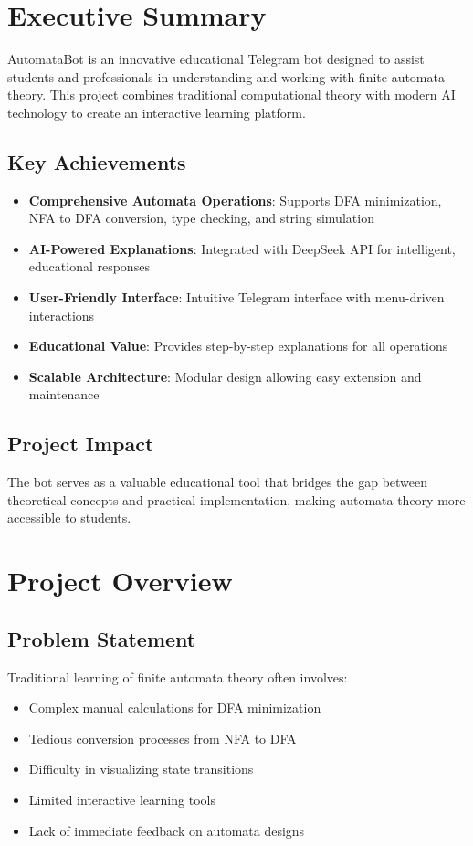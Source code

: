 \documentclass[12pt]{article}
\begin{document}
\tableofcontents
\newpage

\section{Executive Summary}
AutomataBot is an innovative educational Telegram bot designed to assist students and professionals in understanding and working with finite automata theory. This project combines traditional computational theory with modern AI technology to create an interactive learning platform.

\subsection{Key Achievements}
\begin{itemize}
    \item \textbf{Comprehensive Automata Operations}: Supports DFA minimization, NFA to DFA conversion, type checking, and string simulation
    \item \textbf{AI-Powered Explanations}: Integrated with DeepSeek API for intelligent, educational responses
    \item \textbf{User-Friendly Interface}: Intuitive Telegram interface with menu-driven interactions
    \item \textbf{Educational Value}: Provides step-by-step explanations for all operations
    \item \textbf{Scalable Architecture}: Modular design allowing easy extension and maintenance
\end{itemize}

\subsection{Project Impact}
The bot serves as a valuable educational tool that bridges the gap between theoretical concepts and practical implementation, making automata theory more accessible to students.

\section{Project Overview}

\subsection{Problem Statement}
Traditional learning of finite automata theory often involves:
\begin{itemize}
    \item Complex manual calculations for DFA minimization
    \item Tedious conversion processes from NFA to DFA
    \item Difficulty in visualizing state transitions
    \item Limited interactive learning tools
    \item Lack of immediate feedback on automata designs
\end{itemize}
\end{document}
